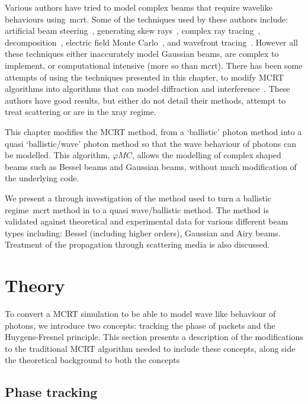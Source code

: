 Various authors have tried to model complex beams that require wavelike behaviours using~\gls*{mcrt}.
Some of the techniques used by these authors include: artificial beam steering~\cite{hokr2015modeling}, generating skew rays~\cite{arnaud1985representation}, complex ray tracing~\cite{harvey2015modeling}, decomposition~\cite{worku2018decomposition}, electric field Monte Carlo~\cite{cai2014electric}, and wavefront tracing~\cite{volpe2017huygens}.
However all these techniques either inaccurately model Gaussian beams, are complex to implement, or computational intensive (more so than \gls*{mcrt}).
There has been some attempts of using the techniques presented in this chapter, to modify MCRT algorithms into algorithms that can model diffraction and interference~\cite{mignon2016fractional,peter2014combining,mahan2018monte,mout2016simulating,fischer2008monte}.
These authors have good results, but either do not detail their methods, attempt to treat scattering or are in the xray regime.


This chapter modifies the MCRT method, from a `ballistic' photon method into a quasi `ballistic/wave' photon method so that the wave behaviour of photons can be modelled.
This algorithm, $\varphi MC$, allows the modelling of complex shaped beams such as Bessel beams and Gaussian beams, without much modification of the underlying code.

We present a through investigation of the method used to turn a ballistic regime~\gls*{mcrt} method in to a quasi wave/ballistic method.
The method is validated against theoretical and experimental data for various different beam types including: Bessel (including higher orders), Gaussian and Airy beams.
Treatment of the propagation through scattering media is also discussed.


\section{Theory}\label{sec:bestheory}

To convert a MCRT simulation to be able to model wave like behaviour of photons, we introduce two concepts: tracking the phase of packets and the Huygens-Fresnel principle.
This section presents a description of the modifications to the traditional MCRT algorithm needed to include these concepts, along side the theoretical background to both the concepts

\subsection{Phase tracking}


